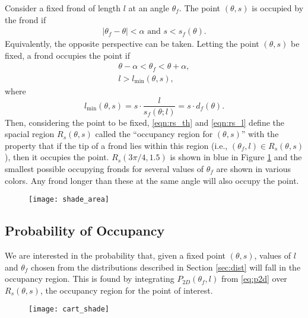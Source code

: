 Consider a fixed frond of length $l$ at an angle $\theta_f$. The point
$(\theta,s)$ is occupied by the frond if
\begin{align*}
	\left|\theta_f - \theta \right| < \alpha
  \mbox{ and }
	s < s_f(\theta).
\end{align*}
Equivalently, the opposite perspective can be taken.
Letting the point $(\theta,s)$ be fixed, a frond occupies the point if
\begin{align}
	\theta - \alpha < \theta_f < \theta + \alpha,
	\label{eqn:rs_th} \\
	l > l_{\min}(\theta,s),
	\label{eqn:rs_l}
\end{align}
where
\begin{equation}
	l_{\min}(\theta,s) = s \cdot \frac{l}{s_f(\theta;l)} = s \cdot d_f(\theta).
  \label{eqn:l_min}
\end{equation}
Then, considering the point to be fixed, \eqref{eqn:rs_th} and \eqref{eqn:rs_l} define the spacial region $R_s(\theta,s)$ called the ``occupancy region for $(\theta,s)$'' with the property that if the tip of a frond lies within this region (i.e., $(\theta_f,l) \in R_s(\theta,s)$), then it occupies the point.
$R_s(3\pi/4,1.5)$ is shown in blue in Figure \ref{fig:shade_area} and the smallest possible occupying fronds for several values of $\theta_f$ are shown in various colors.
Any frond longer than these at the same angle will also occupy the point.

\begin{figure}[h]
	\centering
	\texttt{[image: shade\_area]}
	\label{fig:shade_area}
\end{figure}

\subsection{Probability of Occupancy}
We are interested in the probability that, given a fixed point $(\theta,s)$, values of $l$ and $\theta_f$ chosen from the distributions described in Section \ref{sec:dist} will fall in the occupancy region.
This is found by integrating $P_{2D}(\theta_f, l)$ from \eqref{eq:p2d} over $R_s(\theta,s)$, the occupancy region for the point of interest.

\begin{figure}[h]
	\centering
	\texttt{[image: cart\_shade]}
	\label{fig:cart_shade}
\end{figure}


